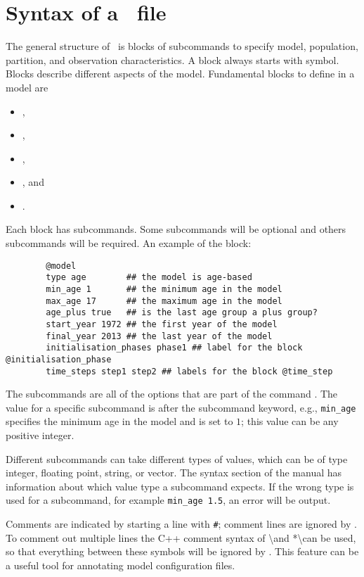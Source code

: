 \section{Syntax of a \CNAME\ file}\label{Sec:stru}

The general structure of \CNAME\ is blocks of subcommands to specify model, population, partition, and observation characteristics. A block always starts with \command{} symbol. Blocks describe different aspects of the model. Fundamental blocks to define in a model are

\begin{itemize}
	\item {},
	\item {},
	\item {},
	\item {}, and
	\item {}.
\end{itemize}

Each block has subcommands. Some subcommands will be optional and others subcommands will be required. An example of the  block:

{\small{\begin{verbatim}
		@model
		type age		## the model is age-based
		min_age 1		## the minimum age in the model
		max_age 17		## the maximum age in the model
		age_plus true	## is the last age group a plus group?
		start_year 1972	## the first year of the model
		final_year 2013 ## the last year of the model
		initialisation_phases phase1 ## label for the block @initialisation_phase
		time_steps step1 step2 ## labels for the block @time_step
		\end{verbatim}}}

The subcommands are all of the options that are part of the command . The value for a specific subcommand is after the subcommand keyword, e.g., \texttt{min\_age} specifies the minimum age in the model and is set to $1$; this value can be any positive integer.

Different subcommands can take different types of values, which can be of type integer, floating point, string, or vector. The syntax section of the manual has information about which value type a subcommand expects. If the wrong type is used for a subcommand, for example \texttt{min\_age 1.5}, an error will be output.

Comments are indicated by starting a line with \texttt{\#}; comment lines are ignored by \CNAME. To comment out multiple lines the C++ comment syntax of \textbackslash* and *\textbackslash can be used, so that everything between these symbols will be ignored by \CNAME. This feature can be a useful tool for annotating model configuration files. 

